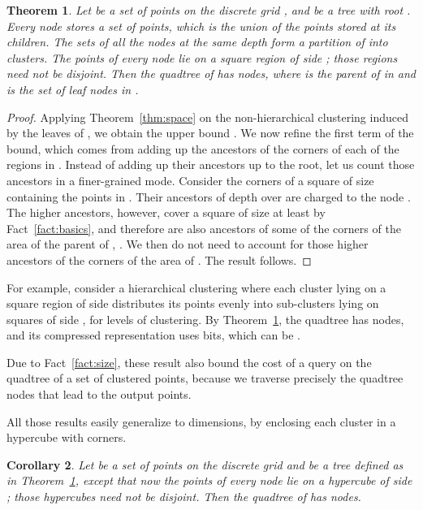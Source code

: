 \documentclass{elsarticle}
\newtheorem{theorem}{Theorem}
\newtheorem{corollary}[theorem]{Corollary}
\begin{document}
\begin{theorem} 
\label{thm:hier}
Let  be a set of points on the discrete grid , and
 be a tree with root . Every node  stores a set 
 of  points,
which is the union of the points stored at its children.
The sets  of all the nodes  
at the same depth form a partition of  into clusters. The points 
 of every node  lie on a square region of side 
; those regions need not be disjoint.
Then the quadtree of  has  nodes, where  is the parent of  in  and  is the set of leaf nodes in .
\end{theorem}

\begin{proof}
Applying Theorem~\ref{thm:space} on the non-hierarchical clustering induced by the  leaves of , we obtain the upper bound
. We now refine the first term of the bound, which comes from adding up the ancestors of the  corners of each of the regions in . Instead of adding up their ancestors up to the root, let us count those ancestors in a finer-grained mode. Consider the  corners of a square of size  containing the points in . Their  ancestors of depth over  are charged to the node . The higher ancestors, however, cover a square of size at least  by Fact~\ref{fact:basics}, and therefore are also ancestors of some of the  corners of the area of the parent of , . We then do not need to account for those higher ancestors of the corners of the area of . The result follows.
\end{proof}

For example, consider a hierarchical clustering where each cluster lying on a square region of side  distributes its points evenly into  sub-clusters lying on squares of side , for  levels of clustering. By Theorem~\ref{thm:hier}, the quadtree has  nodes, and its compressed representation uses  bits, which can be .


Due to Fact~\ref{fact:size}, these result also bound the cost of a query on the quadtree of a set of clustered points, because we traverse precisely the quadtree nodes that lead to the output points.

All those results easily generalize to  dimensions, by enclosing each cluster in a hypercube with  corners.

\begin{corollary} 
Let  be a set of points on the discrete grid  and 
 be a tree defined as in Theorem~\ref{thm:hier}, except that
now the points  of every node  lie on a 
hypercube of side ; those hypercubes need not be disjoint.
Then the quadtree of  has 
 nodes.
\end{corollary}
\end{document}
